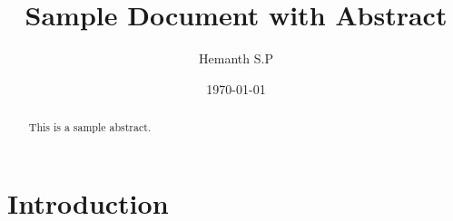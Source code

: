 \documentclass{article}
\begin{document}
\title{Sample Document with Abstract} 
\author{Hemanth S.P} %
\date{\today} %
\maketitle 
\begin{abstract} 
This is a sample abstract.
\end{abstract} 
\section{Introduction} 
\lipsum[1] %
\end{document}
